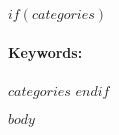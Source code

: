 \documentclass[12pt,a4paper]{article}
\newcommand{\keywords}{\paragraph{Keywords:}}
\begin{document}
$if(categories)$
\keywords $categories$
\vskip 0.8cm
$endif$

$body$

\end{document}
